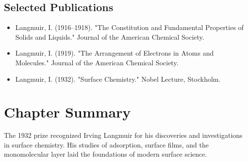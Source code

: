 \subsection*{Selected Publications}

\begin{itemize}

\item Langmuir, I. (1916--1918). "The Constitution and Fundamental Properties of Solids and Liquids." Journal of the American Chemical Society.

\item Langmuir, I. (1919). "The Arrangement of Electrons in Atoms and Molecules." Journal of the American Chemical Society.

\item Langmuir, I. (1932). "Surface Chemistry." Nobel Lecture, Stockholm.

\end{itemize}

\clearpage

\section*{Chapter Summary}

The 1932 prize recognized Irving Langmuir for his discoveries and investigations in surface chemistry. His studies of adsorption, surface films, and the monomolecular layer laid the foundations of modern surface science.
